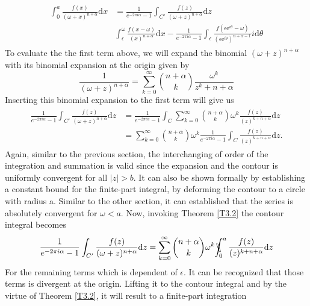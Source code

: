 \begin{align}
\begin{split}
 \int_0^a \frac{f(x)}{(\omega + x)^{n+\alpha}} \mathrm{d}x  & = \frac{1}{e^{-2\pi i\alpha}-1}\int_{C'}\frac{f(z)}{(\omega+z)^{n+\alpha}}\mathrm{d}z  
\\& \int_{\epsilon}^{\omega}\frac{f(x - \omega)}{(x)^{n+\alpha}}\mathrm{d}x -\frac{1}{e^{-2\pi i\alpha}-1} \int_{\epsilon}\frac{f(\epsilon \mathrm{e}^{i\theta} - \omega)}{(\epsilon \mathrm{e}^{i\theta})^{n+\alpha-1}}i\mathrm{d}\theta
\end{split}
\end{align}
To evaluate the the first term above, we will expand the binomial $(\omega+z)^{n+\alpha}$ with its binomial expansion at the origin given by
\begin{equation}
    \frac{1}{(\omega+z)^{n+\alpha}} = \sum_{k=0}^{\infty} {n+\alpha \choose k} \frac{\omega^{k}}{z^k+n+\alpha}
\end{equation}
Inserting this binomial expansion to the first term will give us
\begin{align}
\begin{split}
    \frac{1}{e^{-2\pi i\alpha}-1}\int_{C'}\frac{f(z)}{(\omega+z)^{n+\alpha}}\mathrm{d}z & =  \frac{1}{e^{-2\pi i\alpha}-1}\int_{C}\sum_{k=0}^{\infty} {n+\alpha \choose k} \omega^{k}\frac{f(z)}{(z)^{k+n+\alpha}}\mathrm{d}z \\& = \sum_{k=0}^{\infty} {n+\alpha \choose k} \omega^{k}  \frac{1}{e^{-2\pi i\alpha}-1}\int_{C} \frac{f(z)}{(z)^{k+n+\alpha}}\mathrm{d}z .
\end{split}
\end{align}
Again, similar to the previous section, the interchanging of order of the integration and summation is valid since the expansion and the contour is uniformly convergent for all $|z| > b$. It can also be shown formally by establishing a constant bound for the finite-part integral, by deforming the contour to a circle with radius a. Similar to the other section, it can established that the series is absolutely convergent for $\omega < a$. Now, invoking Theorem \ref{T3.2} the contour integral becomes
\begin{equation}
     \frac{1}{e^{-2\pi i\alpha}-1}\int_{C'}\frac{f(z)}{(\omega+z)^{n+\alpha}}\mathrm{d}z=\sum_{k=0}^{\infty} {n+\alpha \choose k} \omega^{k} \bbint{0}{a} \frac{f(z)}{(z)^{k+n+\alpha}}\mathrm{d}z 
\end{equation}
For the remaining terms which is dependent of $\epsilon$. It can be recognized that those terms is divergent at the origin. Lifting it to the contour integral and by the virtue of Theorem \ref{T3.2}, it will result to a finite-part integration
